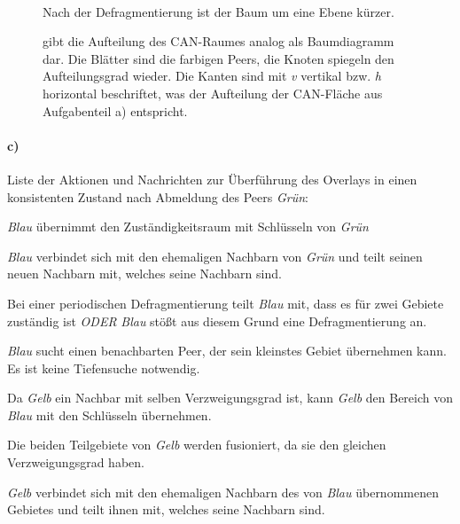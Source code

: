 \documentclass[10pt,a4paper]{article}
\begin{document}
\begin{figure}[H]
\begin{multicols}{3}
\\
\begin{flushleft}
Nach der Defragmentierung ist der Baum um eine Ebene kürzer.
\end{flushleft}
\end{multicols}
\caption{gibt die Aufteilung des CAN-Raumes analog als Baumdiagramm dar. Die Blätter sind die farbigen Peers, die Knoten spiegeln den Aufteilungsgrad wieder. Die Kanten sind mit \textit{v} vertikal bzw. \textit{h} horizontal beschriftet, was der Aufteilung der CAN-Fläche aus Aufgabenteil a) entspricht.} \label{fig:2}
\end{figure}

\newpage

\paragraph*{c)}Liste der Aktionen und Nachrichten zur Überführung des Overlays in einen konsistenten Zustand nach Abmeldung des Peers \textit{Grün}:
\begin{compactitem}[–]
\item \textit{Blau} übernimmt den Zuständigkeitsraum mit Schlüsseln von \textit{Grün}
\item \textit{Blau} verbindet sich mit den ehemaligen Nachbarn von \textit{Grün} und teilt seinen neuen Nachbarn mit, welches seine Nachbarn sind.
\item Bei einer periodischen Defragmentierung teilt \textit{Blau} mit, dass es für zwei Gebiete zuständig ist \textit{ODER} \textit{Blau} stößt aus diesem Grund eine Defragmentierung an.
\item \textit{Blau} sucht einen benachbarten Peer, der sein kleinstes Gebiet übernehmen kann. Es ist keine Tiefensuche notwendig.
\item Da \textit{Gelb} ein Nachbar mit selben Verzweigungsgrad ist, kann \textit{Gelb} den Bereich von \textit{Blau} mit den Schlüsseln übernehmen.
\item Die beiden Teilgebiete von \textit{Gelb} werden fusioniert, da sie den gleichen Verzweigungsgrad haben.
\item \textit{Gelb} verbindet sich mit den ehemaligen Nachbarn des von \textit{Blau} übernommenen Gebietes und teilt ihnen mit, welches seine Nachbarn sind.
\end{compactitem}
\end{document}
